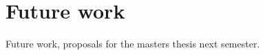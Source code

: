 \section{Future work}\label{sec:futurework}
Future work, proposals for the masters thesis next semester.